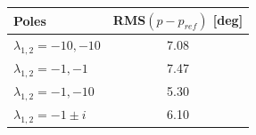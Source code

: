 \begin{tabular}{lc}
\hline
Poles & RMS$(p - p_{ref})$ [deg] \\
\hline
$\lambda_{1,2} = -10, -10$ & 7.08 \\
$\lambda_{1,2} = -1, -1$ & 7.47 \\
$\lambda_{1,2} = -1, -10$ & 5.30 \\
$\lambda_{1,2} = -1 \pm i$ & 6.10 \\
\hline
\end{tabular}
